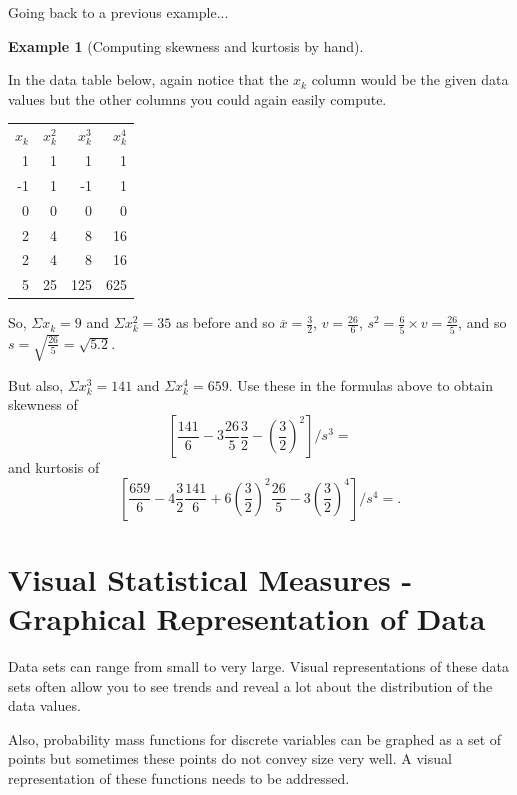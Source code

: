 \documentclass[10pt,]{book}
\theoremstyle{plain}
\theoremstyle{definition}
\theoremstyle{definition}
\newtheorem{example}[theorem]{Example}
\theoremstyle{definition}
\numberwithin{equation}{section}
\newcommand{\hrulemedium}{\noalign{\hrule height 0.07em}}
\begin{document}
\par
Going back to a previous example...%
\begin{example}[Computing skewness and kurtosis by hand]\label{example-9}

In the data table below, again notice that the \(x_k\) column would be the given data values but the other columns you could again easily compute.

\leavevmode%
\begin{table}
\centering
\begin{tabular}{rrrr}
\(x_k\)&\(x_k^2\)&\(x_k^3\)&\(x_k^4\)\tabularnewline\hrulemedium
1&1&1&1\tabularnewline[0pt]
-1&1&-1&1\tabularnewline[0pt]
0&0&0&0\tabularnewline[0pt]
2&4&8&16\tabularnewline[0pt]
2&4&8&16\tabularnewline[0pt]
5&25&125&625
\end{tabular}
\end{table}


So, \(\Sigma x_k = 9\) and \(\Sigma x_k^2 = 35\) as before and so
\(\overline{x} = \frac{3}{2}\), \(v = \frac{26}{6}\), \(s^2 = \frac{6}{5} \times v = \frac{26}{5}\), and so \(s = \sqrt{\frac{26}{5}} = \sqrt{5.2}\).

But also, \(\Sigma x_k^3 = 141\) and \(\Sigma x_k^4 = 659\).  Use these in the formulas above to obtain skewness of
\begin{equation*}\left [ \frac{141}{6} - 3\frac{26}{5} \frac{3}{2} - (\frac{3}{2})^2 \right ] / s^3 = \end{equation*}
and kurtosis of 
\begin{equation*}\left [ \frac{659}{6} - 4\frac{3}{2} \frac{141}{6} + 6 (\frac{3}{2})^2 \frac{26}{5} - 3 (\frac{3}{2})^4 \right ] / s^4 = .\end{equation*}
%
\end{example}
\typeout{************************************************}
\typeout{************************************************}
\section[{Visual Statistical Measures - Graphical Representation of Data}]{Visual Statistical Measures - Graphical Representation of Data}\label{section-8}
Data sets can range from small to very large. Visual representations of these data sets often allow you to see trends and reveal a lot about the distribution of the data values.%
\par

Also, probability mass functions for discrete variables can be graphed as a set of points but sometimes these points do not convey size very well. A visual representation of these functions needs to be addressed.
%
\typeout{************************************************}
\typeout{************************************************}
\end{document}
